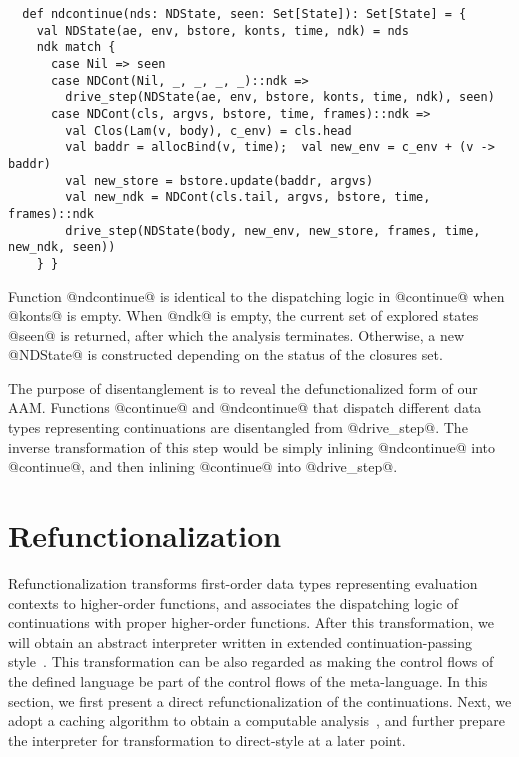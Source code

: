 \documentclass[acmsmall, screen]{acmart}\settopmatter{}
\begin{document}
\begin{lstlisting}
  def ndcontinue(nds: NDState, seen: Set[State]): Set[State] = {
    val NDState(ae, env, bstore, konts, time, ndk) = nds
    ndk match {
      case Nil => seen
      case NDCont(Nil, _, _, _, _)::ndk =>
        drive_step(NDState(ae, env, bstore, konts, time, ndk), seen)
      case NDCont(cls, argvs, bstore, time, frames)::ndk =>
        val Clos(Lam(v, body), c_env) = cls.head
        val baddr = allocBind(v, time);  val new_env = c_env + (v -> baddr)
        val new_store = bstore.update(baddr, argvs)
        val new_ndk = NDCont(cls.tail, argvs, bstore, time, frames)::ndk
        drive_step(NDState(body, new_env, new_store, frames, time, new_ndk, seen))
    } }
\end{lstlisting}

Function @ndcontinue@ is identical to the dispatching logic in @continue@ when @konts@ is empty.
When @ndk@ is empty, the current set of explored states @seen@ is returned, after which the analysis terminates.
Otherwise, a new @NDState@ is constructed depending on the status of the closures set.

The purpose of disentanglement is to reveal the defunctionalized form of our AAM.
Functions @continue@ and @ndcontinue@ that dispatch different data types representing
continuations are disentangled from @drive_step@.
The inverse transformation of this step would be simply inlining @ndcontinue@ into @continue@,
and then inlining @continue@ into @drive_step@.

\section{Refunctionalization} \label{sec:refunc}

Refunctionalization transforms first-order data types representing evaluation contexts
to higher-order functions, and associates the dispatching logic of continuations with
proper higher-order functions.
After this transformation, we will obtain an abstract interpreter written in extended
continuation-passing style~\cite{Danvy:1990:AC:91556.91622}.
This transformation can be also regarded as making the control flows of the defined
language be part of the control flows of the meta-language.
In this section, we first present a direct refunctionalization of the continuations.
Next, we adopt a caching algorithm to obtain a computable analysis~\cite{darais2017abstracting},
and further prepare the interpreter for transformation to direct-style at a later point.
\end{document}
